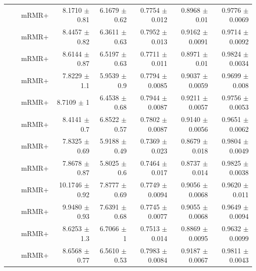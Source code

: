 \begin{longtable}{llp{}rrrrr}
 &  & mRMR+ & 8.1710 {\scriptsize $\pm$ 0.81} & 6.1679 {\scriptsize $\pm$ 0.62} & 0.7754 {\scriptsize $\pm$ 0.012} & 0.8968 {\scriptsize $\pm$ 0.01} & 0.9776 {\scriptsize $\pm$ 0.0069} \\
 &  & mRMR+ & 8.4457 {\scriptsize $\pm$ 0.82} & 6.3611 {\scriptsize $\pm$ 0.63} & 0.7952 {\scriptsize $\pm$ 0.013} & 0.9162 {\scriptsize $\pm$ 0.0091} & 0.9714 {\scriptsize $\pm$ 0.0092} \\
 &  & mRMR+ & 8.6144 {\scriptsize $\pm$ 0.87} & 6.5197 {\scriptsize $\pm$ 0.63} & 0.7711 {\scriptsize $\pm$ 0.011} & 0.8971 {\scriptsize $\pm$ 0.01} & 0.9824 {\scriptsize $\pm$ 0.0034} \\
 &  & mRMR+ & 7.8229 {\scriptsize $\pm$ 1.1} & 5.9539 {\scriptsize $\pm$ 0.9} & 0.7794 {\scriptsize $\pm$ 0.0085} & 0.9037 {\scriptsize $\pm$ 0.0059} & 0.9699 {\scriptsize $\pm$ 0.008} \\
 &  & mRMR+ & 8.7109 {\scriptsize $\pm$ 1} & 6.4538 {\scriptsize $\pm$ 0.68} & 0.7944 {\scriptsize $\pm$ 0.0087} & 0.9211 {\scriptsize $\pm$ 0.0057} & 0.9756 {\scriptsize $\pm$ 0.0053} \\
 &  & mRMR+ & 8.4141 {\scriptsize $\pm$ 0.7} & 6.8522 {\scriptsize $\pm$ 0.57} & 0.7802 {\scriptsize $\pm$ 0.0087} & 0.9140 {\scriptsize $\pm$ 0.0056} & 0.9651 {\scriptsize $\pm$ 0.0062} \\
 &  & mRMR+ & 7.8325 {\scriptsize $\pm$ 0.69} & 5.9188 {\scriptsize $\pm$ 0.49} & 0.7369 {\scriptsize $\pm$ 0.023} & 0.8679 {\scriptsize $\pm$ 0.018} & 0.9804 {\scriptsize $\pm$ 0.0049} \\
 &  & mRMR+ & 7.8678 {\scriptsize $\pm$ 0.87} & 5.8025 {\scriptsize $\pm$ 0.6} & 0.7464 {\scriptsize $\pm$ 0.017} & 0.8737 {\scriptsize $\pm$ 0.014} & 0.9825 {\scriptsize $\pm$ 0.0038} \\
 &  & mRMR+ & 10.1746 {\scriptsize $\pm$ 0.92} & 7.8777 {\scriptsize $\pm$ 0.69} & 0.7749 {\scriptsize $\pm$ 0.0094} & 0.9056 {\scriptsize $\pm$ 0.0068} & 0.9620 {\scriptsize $\pm$ 0.011} \\
 &  & mRMR+ & 9.9480 {\scriptsize $\pm$ 0.93} & 7.6391 {\scriptsize $\pm$ 0.68} & 0.7745 {\scriptsize $\pm$ 0.0077} & 0.9055 {\scriptsize $\pm$ 0.0068} & 0.9649 {\scriptsize $\pm$ 0.0094} \\
 &  & mRMR+ & 8.6253 {\scriptsize $\pm$ 1.3} & 6.7066 {\scriptsize $\pm$ 1} & 0.7513 {\scriptsize $\pm$ 0.014} & 0.8869 {\scriptsize $\pm$ 0.0095} & 0.9632 {\scriptsize $\pm$ 0.0099} \\
 &  & mRMR+ & 8.6568 {\scriptsize $\pm$ 0.77} & 6.5610 {\scriptsize $\pm$ 0.53} & 0.7983 {\scriptsize $\pm$ 0.0084} & 0.9187 {\scriptsize $\pm$ 0.0067} & 0.9811 {\scriptsize $\pm$ 0.0043} \\

\end{longtable}
